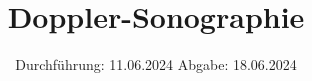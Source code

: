 

\subject{VUS3}
\title{Doppler-Sonographie}
\date{%
  Durchführung: 11.06.2024
  \hspace{3em}
  Abgabe: 18.06.2024
}



\maketitle
\thispagestyle{empty}
\tableofcontents
\newpage






\printbibliography{}


